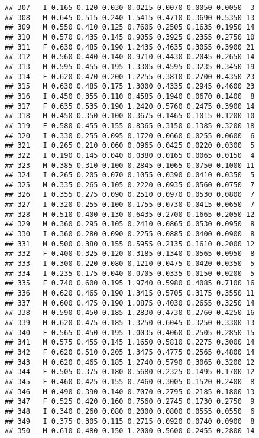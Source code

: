 \documentclass[
]{article}
\begin{document}
\begin{verbatim}
## 307   I 0.165 0.120 0.030 0.0215 0.0070 0.0050 0.0050  3
## 308   M 0.645 0.515 0.240 1.5415 0.4710 0.3690 0.5350 13
## 309   M 0.550 0.410 0.125 0.7605 0.2505 0.1635 0.1950 14
## 310   M 0.570 0.435 0.145 0.9055 0.3925 0.2355 0.2750 10
## 311   F 0.630 0.485 0.190 1.2435 0.4635 0.3055 0.3900 21
## 312   M 0.560 0.440 0.140 0.9710 0.4430 0.2045 0.2650 14
## 313   M 0.595 0.455 0.195 1.3305 0.4595 0.3235 0.3450 19
## 314   F 0.620 0.470 0.200 1.2255 0.3810 0.2700 0.4350 23
## 315   M 0.630 0.485 0.175 1.3000 0.4335 0.2945 0.4600 23
## 316   I 0.450 0.355 0.110 0.4585 0.1940 0.0670 0.1400  8
## 317   F 0.635 0.535 0.190 1.2420 0.5760 0.2475 0.3900 14
## 318   M 0.450 0.350 0.100 0.3675 0.1465 0.1015 0.1200 10
## 319   F 0.580 0.455 0.155 0.8365 0.3150 0.1385 0.3200 18
## 320   I 0.330 0.255 0.095 0.1720 0.0660 0.0255 0.0600  6
## 321   I 0.265 0.210 0.060 0.0965 0.0425 0.0220 0.0300  5
## 322   I 0.190 0.145 0.040 0.0380 0.0165 0.0065 0.0150  4
## 323   M 0.385 0.310 0.100 0.2845 0.1065 0.0750 0.1000 11
## 324   I 0.265 0.205 0.070 0.1055 0.0390 0.0410 0.0350  5
## 325   M 0.335 0.265 0.105 0.2220 0.0935 0.0560 0.0750  7
## 326   I 0.355 0.275 0.090 0.2510 0.0970 0.0530 0.0800  7
## 327   I 0.320 0.255 0.100 0.1755 0.0730 0.0415 0.0650  7
## 328   M 0.510 0.400 0.130 0.6435 0.2700 0.1665 0.2050 12
## 329   M 0.360 0.295 0.105 0.2410 0.0865 0.0530 0.0950  8
## 330   I 0.360 0.280 0.090 0.2255 0.0885 0.0400 0.0900  8
## 331   M 0.500 0.380 0.155 0.5955 0.2135 0.1610 0.2000 12
## 332   F 0.400 0.325 0.120 0.3185 0.1340 0.0565 0.0950  8
## 333   I 0.300 0.220 0.080 0.1210 0.0475 0.0420 0.0350  5
## 334   I 0.235 0.175 0.040 0.0705 0.0335 0.0150 0.0200  5
## 335   F 0.740 0.600 0.195 1.9740 0.5980 0.4085 0.7100 16
## 336   M 0.620 0.465 0.190 1.3415 0.5705 0.3175 0.3550 11
## 337   M 0.600 0.475 0.190 1.0875 0.4030 0.2655 0.3250 14
## 338   M 0.590 0.450 0.185 1.2830 0.4730 0.2760 0.4250 16
## 339   M 0.620 0.475 0.185 1.3250 0.6045 0.3250 0.3300 13
## 340   F 0.565 0.450 0.195 1.0035 0.4060 0.2505 0.2850 15
## 341   M 0.575 0.455 0.145 1.1650 0.5810 0.2275 0.3000 14
## 342   F 0.620 0.510 0.205 1.3475 0.4775 0.2565 0.4800 14
## 343   M 0.620 0.465 0.185 1.2740 0.5790 0.3065 0.3200 12
## 344   F 0.505 0.375 0.180 0.5680 0.2325 0.1495 0.1700 12
## 345   F 0.460 0.425 0.155 0.7460 0.3005 0.1520 0.2400  8
## 346   M 0.490 0.390 0.140 0.7070 0.2795 0.2185 0.1800 13
## 347   F 0.525 0.420 0.160 0.7560 0.2745 0.1730 0.2750  9
## 348   I 0.340 0.260 0.080 0.2000 0.0800 0.0555 0.0550  6
## 349   I 0.375 0.305 0.115 0.2715 0.0920 0.0740 0.0900  8
## 350   M 0.610 0.480 0.150 1.2000 0.5600 0.2455 0.2800 14

\end{verbatim}
\end{document}
